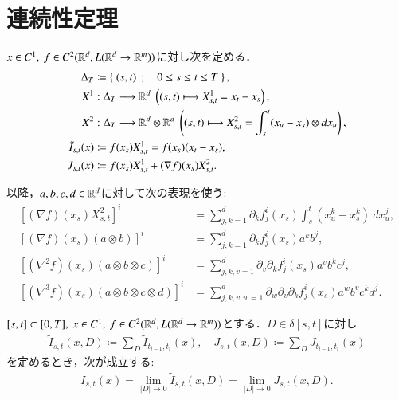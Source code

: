 \section{連続性定理}
	\begin{screen}
		\begin{dfn}[記号の定義]
			$x \in C^1,\ f \in C^2(\mathbb{R}^d,L(\mathbb{R}^d \rightarrow \mathbb{R}^m))$に対し次を定める．
			\begin{align}
				\Delta_T &\coloneqq \Set{(s,t)}{0 \leq s \leq t \leq T}, \\
				X^1 &:\Delta_T \longrightarrow \R^d\ \left( (s,t) \longmapsto X^1_{s,t} = x_t - x_s \right), \\
				X^2 &:\Delta_T \longrightarrow \R^d \otimes \R^d\ \left( (s,t) \longmapsto X^2_{s,t} = \int_s^t (x_u - x_s) \otimes dx_u \right), \\
				\tilde{I}_{s,t}(x) &\coloneqq f(x_s)X^1_{s,t} = f(x_s)(x_t - x_s), \\
				J_{s,t}(x) &\coloneqq f(x_s)X^1_{s,t} + (\nabla f)(x_s)X^2_{s,t}.
			\end{align}
		\end{dfn}
	\end{screen}
	
	以降，$a,b,c,d \in \mathbb{R}^d$に対して次の表現を使う:
	\begin{align}
		\left[ (\nabla f)(x_s)X^2_{s,t} \right]^i &= \sum_{j,k=1}^d \partial_k f^i_j(x_s) \int_s^t \left(x^k_u - x^k_s \right)\ dx^j_u,\\
		\left[ (\nabla f)(x_s)(a \otimes b) \right]^i &= \sum_{j,k=1}^d \partial_k f^i_j(x_s) a^k b^j,\\
		\left[ (\nabla^2 f)(x_s)(a \otimes b \otimes c) \right]^i &= \sum_{j,k,v=1}^d \partial_v \partial_k f^i_j(x_s) a^v b^k c^j,\\
		\left[ (\nabla^3 f)(x_s)(a \otimes b \otimes c \otimes d) \right]^i &= \sum_{j,k,v,w=1}^d \partial_w \partial_v \partial_k f^i_j(x_s) a^w b^v c^k d^j.
	\end{align}
	
	\begin{screen}
		\begin{thm}\label{thm:Riemann_Stieltjes_approximation}
			$[s,t] \subset [0,T],\ x \in C^1,\ f \in C^2(\mathbb{R}^d,L(\mathbb{R}^d \rightarrow \mathbb{R}^m))$とする．$D \in \delta[s,t]$に対し
			\begin{align}
				\tilde{I}_{s,t}(x,D) \coloneqq \sum_D \tilde{I}_{t_{i-1},t_i}(x),
				\quad J_{s,t}(x,D) \coloneqq \sum_D J_{t_{i-1},t_i}(x)
			\end{align}
			を定めるとき，次が成立する:
			\begin{align}
				I_{s,t}(x) = \lim_{|D| \to 0} \tilde{I}_{s,t}(x,D)
				= \lim_{|D| \to 0} J_{s,t}(x,D).
			\end{align}
		\end{thm}
	\end{screen}
	
